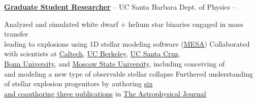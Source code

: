 \documentclass[letterpaper,MMMyyyy,nonstopmode]{simpleresumecv}
\begin{document}
\begin{Body}
\begin{Detail}

\Entry
\href{http://web.physics.ucsb.edu/~astrogroup/}
{\textbf{Graduate Student Researcher}} -- UC Santa Barbara Dept. of Physics \hfill {} -- 
\Gap






\BulletItem
Analyzed and simulated white dwarf + helium star binaries engaged in mass transfer \\leading to explosions using 1D stellar modeling software (\href{http://mesa.sourceforge.net/}{MESA})
\BulletItem
Collaborated with scientists at \href{https://www.caltech.edu/}{Caltech}, \href{https://www.berkeley.edu/}{UC Berkeley}, \href{https://www.ucsc.edu}{UC Santa Cruz}, \\\href{https://www.uni-bonn.de/}{Bonn University}, and \href{https://www.msu.ru/en/}{Moscow State University}, including conceiving of \\and modeling a new type of observable stellar collapse
\BulletItem
Furthered understanding of stellar explosion progenitors by authoring \href{http://adsabs.harvard.edu/cgi-bin/nph-abs_connect?library&libname=MyPapers&libid=561872b258}{six \\ and coauthoring three publications} in \href{http://iopscience.iop.org/journal/0004-637X}{The Astrophysical Journal}
\vspace{2mm}


\end{Detail}
\end{Body}
\end{document}
